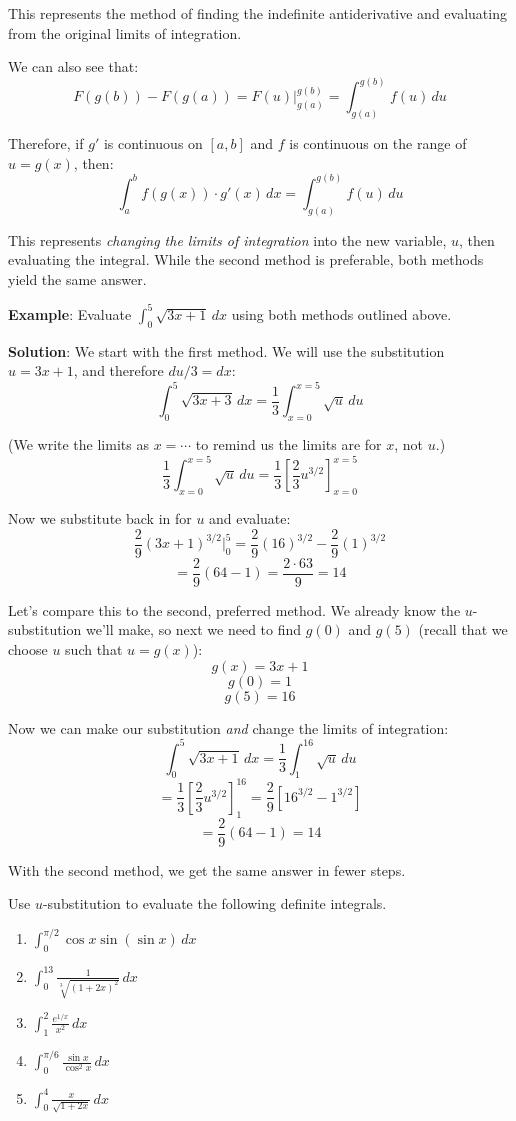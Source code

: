 This represents the method of finding the indefinite antiderivative and 
evaluating from the original limits of integration. 

We can also see that:
$$F(g(b)) - F(g(a)) = F(u)|_{g(a)}^{g(b)} = \int_{g(a)}^{g(b)} f(u)\,du$$

Therefore, if $g'$ is continuous on $\left[ a, b \right]$ and $f$ is continuous 
on the range of $u = g(x)$, then:
$$\int_a^b f(g(x)) \cdot g'(x)\,dx = \int_{g(a)}^{g(b)} f(u)\,du$$

This represents \emph{changing the limits of integration} into the new variable, $u$, 
then evaluating the integral. While the second method is preferable, both 
methods yield the same answer. 

\textbf{Example}: Evaluate $\int_0^{5} \sqrt{3x + 1}\,dx$ using both methods 
outlined above. 

\textbf{Solution}: We start with the first method. We will use the substitution 
$u = 3x + 1$, and therefore $du/3 = dx$:
$$\int_0^5 \sqrt{3x + 3}\,dx = \frac{1}{3} \int_{x = 0}^{x = 5} \sqrt{u}\,du$$

(We write the limits as $x = \cdots$ to remind us the limits are for $x$, not 
$u$.)
$$\frac{1}{3} \int_{x = 0}^{x = 5} \sqrt{u}\,du = \frac{1}{3} \left[ \frac{2}{3} 
u^{3/2} \right]_{x = 0}^{x = 5}$$

Now we substitute back in for $u$ and evaluate:
$$\frac{2}{9} \left( 3x + 1 \right)^{3/2}|_{0}^{5} = \frac{2}{9} \left( 16 
\right)^{3/2} - \frac{2}{9} \left( 1 \right)^{3/2}$$
$$= \frac{2}{9} \left( 64 - 1 \right) = \frac{2 \cdot 63}{9} = 14$$

Let's compare this to the second, preferred method. We already know the 
$u$-substitution we'll make, so next we need to find $g(0)$ and $g(5)$ (recall 
that we choose $u$ such that $u = g(x)$):
$$g(x) = 3x + 1$$
$$g(0) = 1$$
$$g(5) = 16$$

Now we can make our substitution \textit{and} change the limits of integration:
$$\int_0^5 \sqrt{3x + 1}\,dx = \frac{1}{3} \int_1^{16} \sqrt{u}\,du$$
$$= \frac{1}{3} \left[ \frac{2}{3} u^{3/2} \right]_1^{16} = \frac{2}{9} \left[ 
16^{3/2} - 1^{3/2} \right]$$
$$= \frac{2}{9} \left(64 - 1 \right) = 14$$

With the second method, we get the same answer in fewer steps. 

\begin{Exercise}[title = {Definite Integrals and u-substitution}, label = u_def]
Use $u$-substitution to evaluate the following definite integrals. 
\begin{enumerate}
\item $\int_0^{\pi / 2} \cos{x} \sin{ \left( \sin{ x } \right) }\,dx$
\item $\int_0^{13} \frac{1}{\sqrt[3]{\left( 1 + 2x \right)^2}}\,dx$
\item $\int_1^2 \frac{e^{1/x}}{x^2}\,dx$
\item $\int_0^{\pi / 6} \frac{\sin{x}}{\cos^2{x}}\,dx$
\item $\int_0^4 \frac{x}{\sqrt{1 + 2x}}\,dx$
\end{enumerate}
\vspace{50mm}
\end{Exercise}

